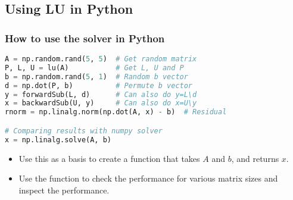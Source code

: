 
\subsection*{Using LU in Python}
\begin{frame}[fragile]
  \frametitle{How to use the solver in Python}
  \begin{lstlisting}[language=Python]
A = np.random.rand(5, 5)  # Get random matrix
P, L, U = lu(A)           # Get L, U and P
b = np.random.rand(5, 1)  # Random b vector
d = np.dot(P, b)          # Permute b vector
y = forwardSub(L, d)      # Can also do y=L\d
x = backwardSub(U, y)     # Can also do x=U\y
rnorm = np.linalg.norm(np.dot(A, x) - b)  # Residual

# Comparing results with numpy solver
x = np.linalg.solve(A, b) 
  \end{lstlisting}
  \pause
  \begin{itemize}
     \item Use this as a basis to create a function that takes $A$ and $b$, and returns $x$.
     \item Use the function to check the performance for various matrix sizes and inspect the performance.
  \end{itemize}

\end{frame}
